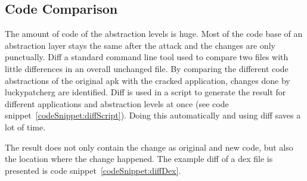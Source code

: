 \subsection{Code Comparison} \label{subsection:forensics-tools-diff}
The amount of code of the abstraction levels is huge.
Most of the code base of an abstraction layer stays the same after the attack and the changes are only punctually.
Diff a standard command line tool used to compare two files with little differences in an overall unchanged file.
\newline
By comparing the different code abstractions of the original \gls{apk} with the cracked application, changes done by \gls{luckypatcherg} are identified.
Diff is used in a script to generate the result for different applications and abstraction levels at once (see code snippet~\ref{codeSnippet:diffScript}).
Doing this automatically and using diff saves a lot of time.
\newline

The result does not only contain the change as original and new code, but also the location where the change happened.
The example diff of a dex file is presented is code snippet~\ref{codeSnippet:diffDex}.
\newline


